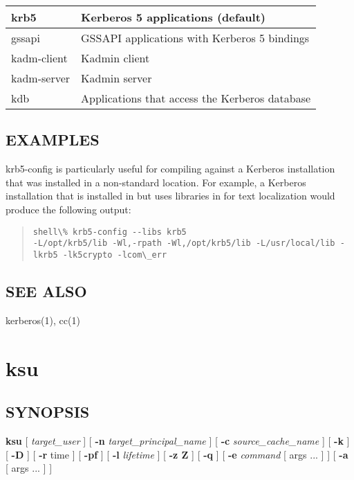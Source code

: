\documentclass[letterpaper,10pt,english]{sphinxmanual}
\begin{document}
\begin{description}
\begin{tabulary}{\linewidth}{|L|L|}
krb5
 & 
Kerberos 5 applications (default)
\\\hline

gssapi
 & 
GSSAPI applications with Kerberos 5 bindings
\\\hline

kadm-client
 & 
Kadmin client
\\\hline

kadm-server
 & 
Kadmin server
\\\hline

kdb
 & 
Applications that access the Kerberos database
\\\hline
\end{tabulary}


\end{description}


\subsection{EXAMPLES}
\label{user/user_commands/krb5-config:examples}
krb5-config is particularly useful for compiling against a Kerberos
installation that was installed in a non-standard location.  For example,
a Kerberos installation that is installed in  but uses
libraries in  for text localization would produce
the following output:
\begin{quote}

\begin{Verbatim}[commandchars=\\\{\}]
shell\% krb5-config --libs krb5
-L/opt/krb5/lib -Wl,-rpath -Wl,/opt/krb5/lib -L/usr/local/lib -lkrb5 -lk5crypto -lcom\_err
\end{Verbatim}
\end{quote}


\subsection{SEE ALSO}
\label{user/user_commands/krb5-config:see-also}
kerberos(1), cc(1)


\section{ksu}
\label{user/user_commands/ksu:ksu-1}\label{user/user_commands/ksu:ksu}\label{user/user_commands/ksu::doc}

\subsection{SYNOPSIS}
\label{user/user_commands/ksu:synopsis}
\textbf{ksu}
{[} \emph{target\_user} {]}
{[} \textbf{-n} \emph{target\_principal\_name} {]}
{[} \textbf{-c} \emph{source\_cache\_name} {]}
{[} \textbf{-k} {]}
{[} \textbf{-D} {]}
{[} \textbf{-r} time {]}
{[} \textbf{-pf} {]}
{[} \textbf{-l} \emph{lifetime} {]}
{[} \textbf{-z \textbar{} Z} {]}
{[} \textbf{-q} {]}
{[} \textbf{-e} \emph{command} {[} args ...  {]} {]} {[} \textbf{-a} {[} args ...  {]} {]}
\end{document}
